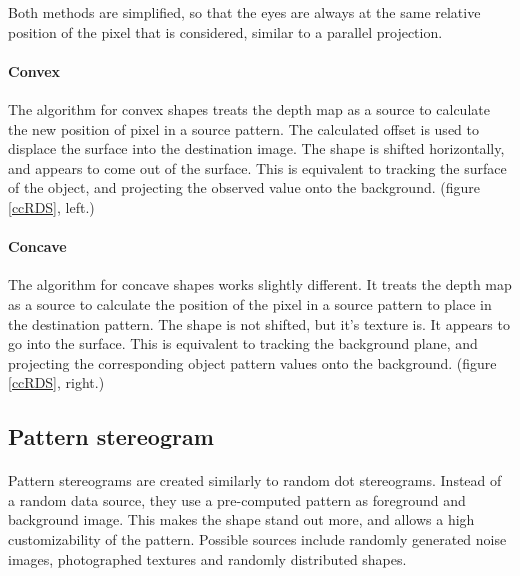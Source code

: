 Both methods are simplified, so that the eyes are always at the same relative position of the pixel that is considered, similar to a parallel projection.

\paragraph{Convex}
The algorithm for convex shapes treats the depth map as a source to calculate the new position of pixel in a source pattern. The calculated offset is used to displace the surface into the destination image. The shape is shifted horizontally, and appears to come out of the surface. This is equivalent to tracking the surface of the object, and projecting the observed value onto the background. (figure \ref{ccRDS}, left.)

\paragraph{Concave}
The algorithm for concave shapes works slightly different. It treats the depth map as a source to calculate the position of the pixel in a source pattern to place in the destination pattern. The shape is not shifted, but it's texture is. It appears to go into the surface. This is equivalent to tracking the background plane, and projecting the corresponding object pattern values onto the background. (figure \ref{ccRDS}, right.)

\subsection{Pattern stereogram}
\paragraph{}
Pattern stereograms are created similarly to random dot stereograms. Instead of a random data source, they use a pre-computed pattern as foreground and background image. This makes the shape stand out more, and allows a high customizability of the pattern. Possible sources include randomly generated noise images, photographed textures and randomly distributed shapes.

